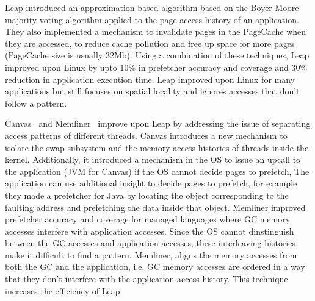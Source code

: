 Leap introduced an approximation based algorithm based on the Boyer-Moore majority voting algorithm applied to the page access history of an application. They also implemented a mechanism to invalidate pages in the PageCache when they are accessed, to reduce cache pollution and free up space for more pages (PageCache size is usually 32Mb). Using a combination of these techniques, Leap improved upon Linux by upto 10\% in prefetcher accuracy and coverage and 30\% reduction in application execution time. Leap improved upon Linux for many applications but still focuses on spatial locality and ignores accesses that don't follow a pattern.

Canvas~\cite{canvas} and Memliner~\cite{memliner} improve upon Leap by addressing the issue of separating access patterns of different threads. Canvas introduces a new mechanism to isolate the swap subsystem and the memory access histories of threads inside the kernel. Additionally, it introduced a mechanism in the OS to issue an upcall to the application (JVM for Canvas) if the OS cannot decide pages to prefetch, The application can use additional insight to decide pages to prefetch, for example they made a prefetcher for Java by locating the object corresponding to the faulting address and prefetching the data inside that object. Memliner improved prefetcher accuracy and coverage for managed languages where GC memory accesses interfere with application accesses. Since the OS cannot dinstinguish between the GC accesses and application accesses, these interleaving histories make it difficult to find a pattern. Memliner, aligns the memory accesses from both the GC and the application, i.e. GC memory accesses are ordered in a way that they don't interfere with the application access history. This technique increases the efficiency of Leap.

